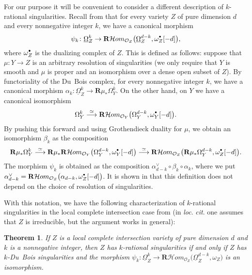 \documentclass[JEP,XML,SOM,Unicode]{cedram}
\newcommand{\sbullet}{{\scriptscriptstyle\bullet}}
\newcommand{\csbullet}{{\raisebox{1pt}{$\sbullet$}}}
\theoremstyle{plain}
\newtheorem{thm}{Theorem}[section]
\theoremstyle{definition}
\newcommand\R{{\mathbf R}}
\newcommand\cH{\mathcal{H}}
\newcommand\cO{\mathcal{O}}
\newcommand\cH{\mathcal{H}}
\newcommand\cO{\mathcal{O}}
\begin{document}
For our purpose it will be convenient to consider a different description of $k$-rational singularities. Recall from
\cite[\S 6]{MP2} that for every variety $Z$ of pure dimension $d$ and every nonnegative integer $k$, we have a canonical morphism\vspace*{-3pt}
\begin{equation}\label{eq_can1}
\psi_k\colon \underline{\Omega}_Z^k\to \R\cH om_{\cO_Z}\big(\underline{\Omega}_Z^{d-k},\omega_Z^{\csbullet}[-d]\big),
\end{equation}
where $\omega_Z^{\csbullet}$ is the dualizing complex of $Z$. This is defined as follows: suppose that $\mu\colon Y\to Z$
is an arbitrary resolution of singularities (we only require that $Y$ is smooth and $\mu$ is proper and an isomorphism
over a dense open subset of $Z$). By functoriality of the Du~Bois complex, for every nonnegative integer $k$, we have a canonical morphism
$\alpha_k\colon\underline{\Omega}_Z^k\to \R\mu_*\Omega_Y^k$. On the other hand, on $Y$ we have a canonical isomorphism\vspace*{-3pt}
\[\Omega_Y^k\overset{\simeq}\longrightarrow \R\cH om_{\cO_Y}\big(\Omega_Y^{d-k},\omega_Y^{\csbullet}[-d]\big).\]
By pushing this forward and using Grothendieck duality for $\mu$, we obtain an isomorphism $\beta_k$ as the composition\vspace*{-3pt}
\[\R\mu_*\Omega_Y^k\overset{\simeq}\longrightarrow \R\mu_*\R\cH om_{\cO_Y}\big(\Omega_Y^{d-k},\omega_Y^{\csbullet}[-d]\big)\overset{\simeq}\longrightarrow
\R\cH om_{\cO_Z}\big(\R\mu_*\Omega_Y^{d-k},\omega_Z^{\csbullet}[-d]\big).\]
The morphism $\psi_k$ is obtained as the composition $\alpha_{d-k}^{\vee}\circ \beta_k\circ\alpha_k$, where we put
$\alpha_{d-k}^{\vee}=\R\cH om_{\cO_Z}\big(\alpha_{d-k},\omega_Z^{\csbullet}[-d]\big)$.
It is shown in \cite[Prop.\,6.1]{MP2} that this definition does not depend on the choice of resolution of singularities.

With this notation, we have the following characterization of $k$-rational singularities in the local complete intersection case
from \cite{MP2} (in \emph{loc}. \emph{cit}. one assumes that $Z$ is irreducible, but the argument works in general):

\begin{thm}\label{chr_k_rat}
If $Z$ is a local complete intersection variety of pure dimension $d$ and $k$ is a nonnegative integer, then $Z$ has $k$-rational singularities
if and only if $Z$ has $k$-Du~Bois singularities and the morphism $\psi_k\colon \underline{\Omega}_Z^k\to \R\cH om_{\cO_Z}\big(\underline{\Omega}_Z^{d-k},\omega_Z\big)$ is an isomorphism.
\end{thm}
\end{document}
